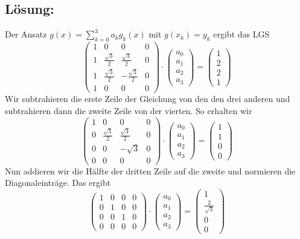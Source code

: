 \subsection*{Lösung:}
Der Ansatz $g(x)=\sum_{k=0}^3 a_kg_k(x)$ mit $g(x_k)=y_k$ ergibt das LGS
$$
\begin{pmatrix}1 & 0 & 0 &0 \\ 1&\frac{\sqrt{3}}{2}& \frac{\sqrt{3}}{2} & 0\\ 1& \frac{\sqrt{3}}{2}&-\frac{\sqrt{3}}{2}&0  \\1 & 0 & 0& 0 \end{pmatrix}\cdot \begin{pmatrix} a_0\\a_1\\a_2\\a_3 \end{pmatrix}= \begin{pmatrix} 1\\2\\2\\1 \end{pmatrix}
$$
Wir subtrahieren die erste Zeile der Gleichung von den den drei anderen und subtrahieren dann die zweite Zeile von der vierten. So erhalten wir
$$
\begin{pmatrix}1 & 0 & 0 &0 \\ 0&\frac{\sqrt{3}}{2}& \frac{\sqrt{3}}{2} & 0\\ 0& 0&-\sqrt{3}&0  \\0 & 0 & 0& 0 \end{pmatrix}\cdot \begin{pmatrix} a_0\\a_1\\a_2\\a_3 \end{pmatrix}= \begin{pmatrix} 1\\1\\0\\0 \end{pmatrix}
$$
Nun addieren wir die Hälfte der dritten Zeile auf die zweite und normieren die Diagonaleinträge. Das ergibt
$$
\begin{pmatrix}1 & 0 & 0 &0 \\ 0&1& 0 & 0\\ 0& 0&1&0  \\0 & 0 & 0& 0 \end{pmatrix}\cdot \begin{pmatrix} a_0\\a_1\\a_2\\a_3 \end{pmatrix}= \begin{pmatrix} 1\\\frac{2}{\sqrt{3}}\\0\\0 \end{pmatrix}
$$
